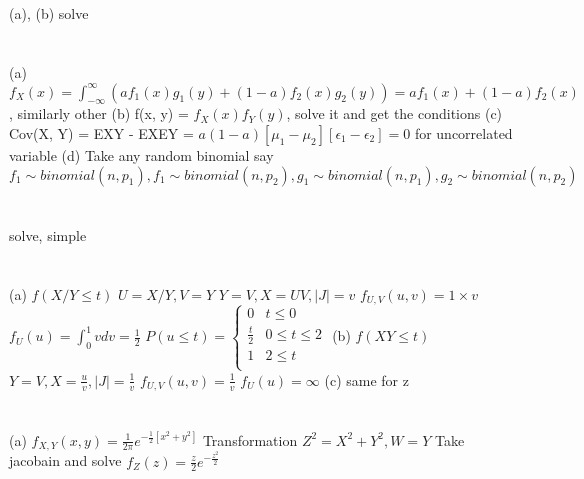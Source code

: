 \documentclass{report}
\begin{document}
\section{}
(a), (b) solve
\section{}
(a) $f_X(x) =  \int_{-\infty}^{\infty}(af_1(x)g_1(y) + (1-a)f_2(x)g_2(y)) = af_1(x) + (1 - a)f_2(x)$, similarly other
\newline
(b) f(x, y) = $f_X(x)f_Y(y)$, solve it and get the conditions
\newline
(c) Cov(X, Y) = EXY - EXEY = $a(1-a)[\mu_1 - \mu_2][\epsilon_1 - \epsilon_2] = 0$ for uncorrelated variable
\newline
(d) Take any random binomial
say
$f_1 \sim binomial(n, p_1), f_1 \sim binomial(n, p_2), g_1 \sim binomial(n, p_1), g_2 \sim binomial(n, p_2)$
\newline
\section{}
solve, simple
\newline
\section{}
(a) $f(X/Y \le t)$
\newline
$U = X/Y, V = Y$
\newline
$Y = V, X = UV, |J| = v$
\newline
$f_{U, V}(u, v) = 1 \times v$
\newline
$f_{U}(u) = \int_{0}^{1}vdv = \frac{1}{2}$
\newline
$P(u \le t) = \begin{cases}
	0 & t \le 0 \\
	\frac{t}{2} & 0 \le t \le 2  \\
	1 & 2 \le t \\
\end{cases}$
(b) $f(XY \le t)$
\newline
$Y = V, X = \frac{u}{v}, |J| = \frac{1}{v}$
\newline
$f_{U, V}(u, v) = \frac{1}{v}$
\newline
$f_{U}(u) = \infty$
\newline
(c) same for z
\newline
\section{}
(a) $f_{X, Y}(x, y) = \frac{1}{2\pi}e^{-\frac{1}{2}\left[x^2 + y^2\right]}$
\newline
Transformation
$Z^2 = X^2 + Y^2, W = Y$
Take jacobain and solve
\newline
$f_{Z}(z) = \frac{z}{2}e^{-\frac{z^2}{2}}$
\newline
\end{document}
